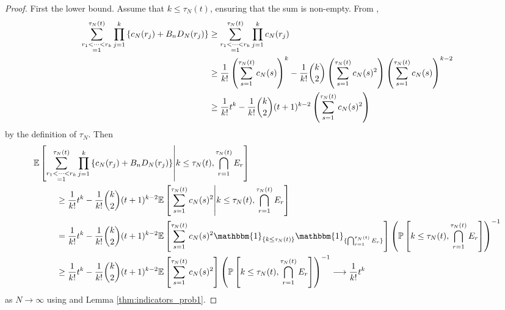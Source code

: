 \documentclass{article}
\newcommand{\Prob}{\mathbb{P}}
\newcommand{\E}{\mathbb{E}}
\newcommand{\I}[1]{\mathbbm{1}_{\{#1\}}}
\newcommand{\1}[1]{\mathbbm{1}_{#1}}
\begin{document}
\begin{proof}
First the lower bound. 
Assume that $k\leq \tau_N(t)$, ensuring that the sum is non-empty.
From \citet[Equation (8)]{koskela2018},
\begin{align}
\sum_{\substack{r_1<\dots<r_k \\ =1}}^{\tau_N(t)}\prod_{j=1}^k 
\left\{ c_N(r_j) + B_n D_N(r_j) \right\}
&\geq \sum_{\substack{r_1<\dots<r_k \\ =1}}^{\tau_N(t)}\prod_{j=1}^k c_N(r_j) \notag\\
&\geq \frac{1}{k!} \left( \sum_{s=1}^{\tau_N(t)} c_N(s) \right)^k 
- \frac{1}{k!} \binom{k}{2} \left( \sum_{s=1}^{\tau_N(t)} c_N(s)^2 \right)
\left( \sum_{s=1}^{\tau_N(t)} c_N(s) \right)^{k-2} \notag\\
&\geq \frac{1}{k!} t^k
 - \frac{1}{k!} \binom{k}{2} (t+1)^{k-2} \left( \sum_{s=1}^{\tau_N(t)} c_N(s)^2 \right) 
\end{align}
by the definition of $\tau_N$.
Then
\begin{align}\label{eq:10}
\E &\left[ \sum_{\substack{r_1<\dots<r_k \\ =1}}^{\tau_N(t)}\prod_{j=1}^k 
\left\{ c_N(r_j) + B_n D_N(r_j) \right\}  
\middle| k\leq\tau_N(t), \bigcap_{r=1}^{\tau_N(t)} E_r \right] \notag\\
&\qquad \geq \frac{1}{k!} t^k - \frac{1}{k!} \binom{k}{2} (t+1)^{k-2} \E\left[ \sum_{s=1}^{\tau_N(t)} c_N(s)^2 \middle| k\leq\tau_N(t), \bigcap_{r=1}^{\tau_N(t)} E_r \right] \notag\\
&\qquad = \frac{1}{k!} t^k - \frac{1}{k!} \binom{k}{2} (t+1)^{k-2} \E\left[ \sum_{s=1}^{\tau_N(t)} c_N(s)^2 \I{k\leq\tau_N(t)} \I{\bigcap_{r=1}^{\tau_N(t)} E_r} \right] \left(\Prob \left[k\leq\tau_N(t), \bigcap_{r=1}^{\tau_N(t)} E_r \right] \right)^{-1}  \notag\\
&\qquad \geq \frac{1}{k!} t^k - \frac{1}{k!} \binom{k}{2} (t+1)^{k-2} \E\left[ \sum_{s=1}^{\tau_N(t)} c_N(s)^2 \right]
\left(\Prob \left[k\leq\tau_N(t), \bigcap_{r=1}^{\tau_N(t)} E_r \right] \right)^{-1}
\longrightarrow \frac{1}{k!} t^k
\end{align}
as $N\to\infty$ using \citet[Equation (5)]{brown2020} and Lemma \ref{thm:indicators_prob1}. %


\end{proof}
\end{document}
